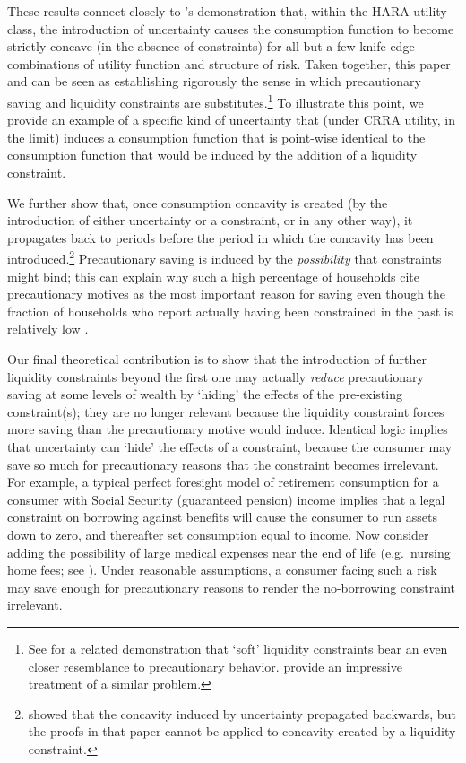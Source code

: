 \documentclass[titlepage]{\econtex}
\begin{document}
  These results connect closely to \citet{carroll&kimball:concavity}'s demonstration that, within the HARA utility class, the introduction of uncertainty causes the consumption function to become strictly concave (in the absence of constraints) for all but a few knife-edge combinations of utility function and structure of risk.  Taken together, this paper and \citet{carroll&kimball:concavity} can be seen as establishing rigorously the sense in which precautionary saving and liquidity  constraints are substitutes.\footnote{See \citet{fernandez-corugedo:softlc} for a related demonstration that `soft' liquidity constraints bear an even closer resemblance to precautionary behavior. \citet{MendelsonAmihud:consumption} provide an impressive treatment of a similar problem.} To illustrate this point, we provide an example of a specific kind of uncertainty that (under CRRA utility, in the limit) induces a consumption function that is point-wise identical to the consumption function that would be induced by the addition of a liquidity constraint.

  We further show that, once consumption concavity is created (by the introduction of either uncertainty or a constraint, or in any other way), it propagates back to periods before the period in which the concavity has been introduced.\footnote{\citet{carroll&kimball:concavity} showed that the concavity induced by uncertainty propagated backwards, but the proofs in that paper cannot be applied to concavity created by a liquidity constraint.} Precautionary saving is induced by the \textit{possibility} that constraints might bind; this can explain why such a high percentage of households cite precautionary motives as the most important reason for saving \citep{kennickell&lusardi:scfquestions} even though the fraction of households who report actually having been constrained in the past is relatively low \citep{jappelli:whoisconstr}.

  Our final theoretical contribution is to show that the introduction of further liquidity constraints beyond the first one may actually \textit{reduce} precautionary saving at some levels of wealth by `hiding' the effects of the pre-existing constraint(s); they are no longer relevant because the liquidity constraint forces more saving than the precautionary motive would induce. Identical logic implies that uncertainty can `hide' the effects of a constraint, because the consumer may save so much for precautionary reasons that the constraint becomes irrelevant. For example, a typical perfect foresight model of retirement consumption for a consumer with Social Security (guaranteed pension) income implies that a legal constraint on borrowing against benefits will cause the consumer to run assets down to zero, and thereafter set consumption equal to income.  Now consider adding the possibility of large medical expenses near the end of life (e.g.\ nursing home fees; see \citealp{aclvJoy}).  Under reasonable assumptions, a consumer facing such a risk may save enough for precautionary reasons to render the no-borrowing constraint irrelevant.
\end{document}
